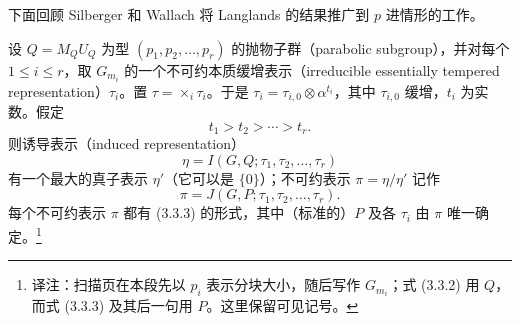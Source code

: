 下面回顾 Silberger 和 Wallach 将 Langlands 的结果推广到 $p$ 进情形的工作。

设 $Q=M_QU_Q$ 为型 $(p_1,p_2,\ldots,p_r)$ 的抛物子群（parabolic subgroup），并对每个 $1\leq i\leq r$，取 $G_{m_i}$ 的一个不可约本质缓增表示（irreducible essentially tempered representation）$\tau_i$。置 $\tau=\mathop{\times}_i\tau_i$。于是 $\tau_i=\tau_{i,0}\otimes\alpha^{t_i}$，其中 $\tau_{i,0}$ 缓增，$t_i$ 为实数。假定
\begin{equation}
t_1>t_2>\cdots>t_r.\tag{3.3.1}
\end{equation}
则诱导表示（induced representation）
\begin{equation}
\eta=I(G,Q;\tau_1,\tau_2,\ldots,\tau_r)\tag{3.3.2}
\end{equation}
有一个最大的真子表示 $\eta'$（它可以是 $\{0\}$）；不可约表示 $\pi=\eta/\eta'$ 记作
\begin{equation}
\pi=J(G,P;\tau_1,\tau_2,\ldots,\tau_r).\tag{3.3.3}
\end{equation}
每个不可约表示 $\pi$ 都有 (3.3.3) 的形式，其中（标准的）$P$ 及各 $\tau_i$ 由 $\pi$ 唯一确定。\footnote{译注：扫描页在本段先以 $p_i$ 表示分块大小，随后写作 $G_{m_i}$；式 (3.3.2) 用 $Q$，而式 (3.3.3) 及其后一句用 $P$。这里保留可见记号。}

